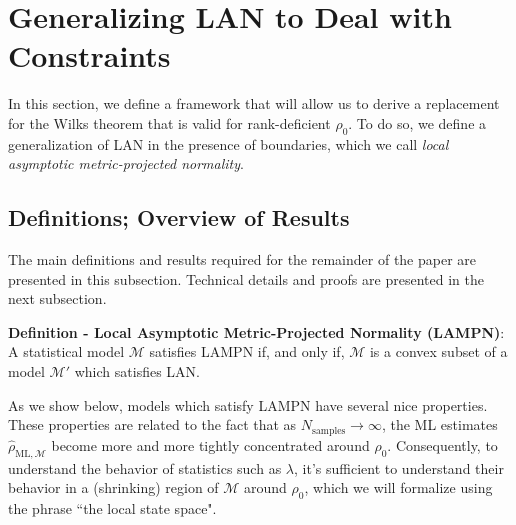 \documentclass[aps,pra, twocolumn]{revtex4-1}
\newcommand{\M}{\mathcal{M}}
\newcommand{\rhohat}{\hat{\rho}}
\newcommand{\rhoML}[1]{\rhohat_{\scriptscriptstyle{\mathrm{ML},#1}}}
\begin{document}
\section{Generalizing LAN to Deal with Constraints}
\label{sec:lanreplacement}

In this section, we define a framework that will allow us to derive a replacement for the Wilks theorem that is valid for rank-deficient $\rho_{0}$. To do so, we define a generalization of LAN in the presence of boundaries, which we call \emph{local asymptotic metric-projected normality}.

\subsection{Definitions; Overview of Results}

The main definitions and results required for the remainder of the paper are presented in this subsection. Technical details and proofs are presented in the next subsection.

\textbf{Definition - Local Asymptotic Metric-Projected Normality (LAMPN)}: A statistical model $\M$ satisfies LAMPN if, and only if, $\M$ is a convex subset of a model $\M'$ which satisfies LAN.

As we show below, models which satisfy LAMPN have several nice properties. These properties are related to the fact that as $N_{\mathrm{samples}}\rightarrow \infty$, the ML estimates $\rhoML{\M}$ become more and more tightly concentrated around $\rho_{0}$. Consequently, to understand the behavior of statistics such as $\lambda$, it's sufficient to understand their behavior in a (shrinking) region of $\M$ around $\rho_{0}$, which we will formalize using the phrase ``the local state space".
\end{document}
